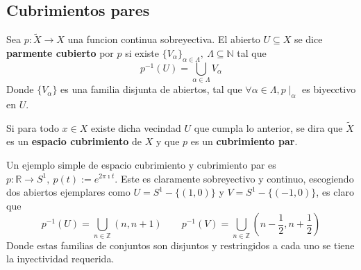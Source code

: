 \subsection{Cubrimientos pares}
\begin{definicion}
Sea \(p : \tilde{X} \to X\) una funcion continua sobreyectiva. El abierto \(U
\subseteq X\) se dice \textbf{parmente cubierto} por \(p\) si existe
\(\{V_\alpha\}_{\alpha \in \Lambda},\ \Lambda \subseteq \mathbb N\) tal que
\[ p^{-1} (U) = \bigcup_{\alpha \in \Lambda} V_\alpha \]
Donde \(\{V_\alpha\}\) es una familia disjunta de abiertos, tal que
\(\forall \alpha \in \Lambda, p \mid_{\alpha}\) es biyecctivo en \(U\).

Si para todo \(x \in X\) existe dicha vecindad \(U\) que cumpla lo
anterior, se dira que \(\tilde{X}\) es un \textbf{espacio cubrimiento} de \(X\)
y que \(p\) es un \textbf{cubrimiento par}.
\end{definicion}

Un ejemplo simple de espacio cubrimiento y cubrimiento par es \(p :
\mathbb R \to S^1,\ p(t) := e^{2 \pi \imath t}\). Este es claramente
sobreyectivo y continuo, escogiendo dos abiertos ejemplares como \(U =
S^1 - \{(1,0)\}\) y \(V = S^1 - \{(-1,0)\}\), es claro que
\[
    p^{-1} (U) = \bigcup_{n \in \mathbb Z} (n, n+1)
    \qquad p^{-1} (V) = \bigcup_{n \in \mathbb Z} (n - \frac 1 2, n + \frac 1
    2 )
\]
Donde estas familias de conjuntos son disjuntos y restringidos a cada
uno se tiene la inyectividad requerida.

